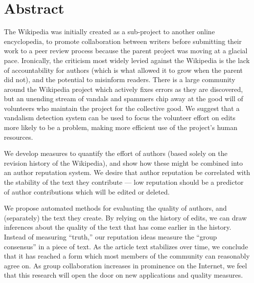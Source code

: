 \chapter{Abstract}
\begin{comment}
WikiTrust: Measuring Group Collaboration
by
B. Thomas Adler
\end{comment}

The Wikipedia was initially created as a sub-project to another
online encyclopedia, to promote collaboration between writers
before submitting their work to a peer review process because
the parent project was moving at a glacial pace.
Ironically, the criticism most widely levied against the Wikipedia
is the lack of accountability
for authors (which is what allowed it to grow when the parent did not),
and the potential to misinform readers.
There is a large community around the Wikipedia project which actively
fixes errors as they are discovered, but an unending
stream of vandals and spammers chip
away at the good will of volunteers who
maintain the project for the collective good.
We suggest that a vandalism detection system
can be used to focus
the volunteer effort on edits more likely to be a problem,
making more efficient use of the project's human resources.

We develop measures to quantify the effort of authors
(based solely on the revision history of the Wikipedia),
and show how these might be combined into an author
reputation system.
We desire that author reputation be correlated with the
stability of the text they contribute ---
low reputation should be a predictor of author
contributions which will be edited or deleted.

We propose automated methods for evaluating the quality of
authors, and (separately) the text they create.
By relying on the history of edits, we can draw inferences about
the quality of the text that has come earlier in the history.
Instead of measuring ``truth,'' our reputation ideas
measure the ``group consensus'' in a piece of text.
As the article text stabilizes over time, we conclude that
it has reached a form which most members of the community can
reasonably agree on.
As group collaboration increases in prominence on the Internet,
we feel that this research will open the door on new applications
and quality measures.

